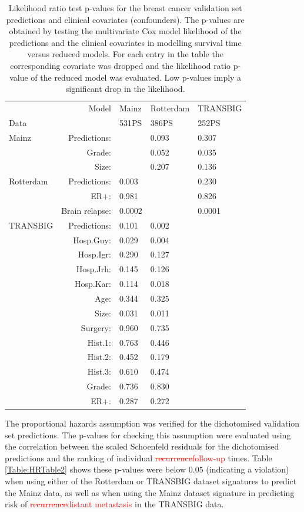 \documentclass[letterpaper,12pt]{article}
\begin{document}

\begin{table}[h]
\centering
\caption{Likelihood ratio test p-values for the breast cancer validation set predictions and clinical covariates (confounders). The p-values are obtained by testing the multivariate Cox model likelihood of the predictions and the clinical covariates in modelling survival time versus reduced models. For each entry in the table the corresponding covariate was dropped and the likelihood ratio p-value of the reduced model was evaluated. Low p-values imply a significant drop in the likelihood.}
\label{Table:ValIndep2}
\begin{small}
    \begin{tabular}{ | l r | l | l | l |} 
    \hline
     & Model & Mainz & Rotterdam & TRANSBIG \\ Data & & 531PS & 386PS & 252PS \\\hline \hline
    Mainz & Predictions:& & 0.093& 0.307\\ &Grade: & & 0.052& 0.035\\ &Size:& & 0.207& 0.136\\\hline
		Rotterdam  & Predictions:& 0.003& & 0.230\\ &ER+: & 0.981& & 0.826\\ &Brain relapse: & 0.0002& & 0.0001\\\hline
		TRANSBIG  & Predictions:& 0.101& 0.002& \\ & Hosp.Guy: & 0.029& 0.004& \\ & Hosp.Igr: & 0.290& 0.127& \\ & Hosp.Jrh: & 0.145& 0.126& \\ & Hosp.Kar: & 0.114& 0.018& \\ & Age:& 0.344& 0.325& \\ & Size: & 0.031& 0.011& \\ & Surgery: & 0.960& 0.735& \\ & Hist.1: & 0.763& 0.446& \\ & Hist.2: & 0.452& 0.179& \\ & Hist.3: & 0.610& 0.474& \\ & Grade:& 0.736& 0.830& \\ &ER+:& 0.287 & 0.272& \\ \hline
    \end{tabular}
\end{small}
\end{table}


The proportional hazards assumption was verified for the dichotomised validation set predictions. The p-values for checking this assumption were evaluated using the correlation between the scaled Schoenfeld residuals for the dichotomised predictions and the ranking of individual \textcolor{red}{\sout{recurrence}follow-up} times. Table \ref{Table:HRTable2} shows these p-values were below $0.05$ (indicating a violation) when using either of the Rotterdam or TRANSBIG dataset signatures to predict the Mainz data, as well as when using the Mainz dataset signature in predicting risk of \textcolor{red}{\sout{recurrence}distant metastasis} in the TRANSBIG data.
\end{document}
